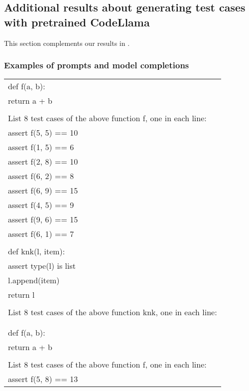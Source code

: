 \clearpage
\subsection{Additional results about generating test cases with pretrained CodeLlama}
\label{sec:appendix:experiments:codellama}

This section complements our results in .

\subsubsection{Examples of prompts and model completions}
\label{sec:experiments:codellama:examples}


\begin{table}[h!]
\centering
\small
\begin{tabular}{l}
\toprule
def f(a, b): \\
\quad \quad   return a + b \\
 \\
List 8 test cases of the above function f, one in each line: \\
assert f(5, 5) == 10 \\
assert f(1, 5) == 6 \\
assert f(2, 8) == 10 \\
assert f(6, 2) == 8 \\
assert f(6, 9) == 15 \\
assert f(4, 5) == 9 \\
assert f(9, 6) == 15 \\
assert f(6, 1) == 7 \\
 \\
def knk(l, item): \\
\quad \quad   assert type(l) is list \\
\quad \quad   l.append(item) \\
\quad \quad   return l \\
 \\
List 8 test cases of the above function knk, one in each line: \\
\\
\bottomrule
\\
def f(a, b): \\
\quad \quad   return a + b \\
 \\
List 8 test cases of the above function f, one in each line: \\
assert f(5, 8) == 13 \\

\end{tabular}
\end{table}
